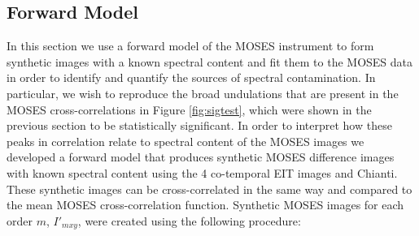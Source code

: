 			
	
	\subsection{Forward Model}\label{sec:fomod}
		In this section we use a forward model of the MOSES instrument to form synthetic images with a known spectral content and fit them to the MOSES data in order to identify and quantify the sources of spectral contamination. 
		In particular, we wish to reproduce the broad undulations that are present in the MOSES cross-correlations in Figure \ref{fig:sigtest}, which were shown in the previous section to be statistically significant.
		In order to interpret how these peaks in correlation relate to spectral content of the MOSES images we developed a forward model that produces synthetic MOSES difference images with known spectral content using the 4 co-temporal EIT images and Chianti.
		These synthetic images can be cross-correlated in the same way and compared to the mean MOSES cross-correlation function. 
		Synthetic MOSES images for each order $m$, $I'_{mxy}$, were created using the following procedure:
